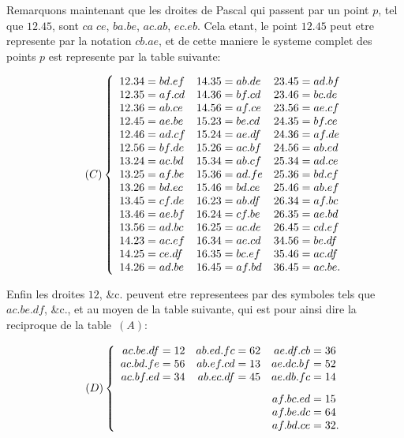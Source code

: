 \documentclass[12pt,a4paper]{article}
\begin{document}
\newpage
\setcounter{page}{552}

Remarquons maintenant que les droites de Pascal qui passent par un point $p$, tel que $12.45$, sont $ca\;ce$, $ba.be$, $ac.ab$, $ec.eb$. Cela etant, le point $12.45$ peut etre represente par la notation $cb.ae$, et de cette maniere le systeme complet des points $p$ est represente par la table suivante:

\begin{equation}
\tag{$C$}
\left\{
\begin{array}{r@{\;=\;}l r@{\;=\;}l r@{\;=\;}l}
12.34 & bd.ef & 14.35 & ab.de & 23.45 & ad.bf \\
12.35 & af.cd & 14.36 & bf.cd & 23.46 & bc.de \\
12.36 & ab.ce & 14.56 & af.ce & 23.56 & ae.cf \\
12.45 & ae.be & 15.23 & be.cd & 24.35 & bf.ce \\
12.46 & ad.cf & 15.24 & ae.df & 24.36 & af.de \\
12.56 & bf.de & 15.26 & ac.bf & 24.56 & ab.ed \\
13.24 & ac.bd & 15.34 & ab.cf & 25.34 & ad.ce \\
13.25 & af.be & 15.36 & ad.fe & 25.36 & bd.cf \\
13.26 & bd.ec & 15.46 & bd.ce & 25.46 & ab.ef \\
13.45 & cf.de & 16.23 & ab.df & 26.34 & af.bc \\
13.46 & ae.bf & 16.24 & cf.be & 26.35 & ae.bd \\
13.56 & ad.bc & 16.25 & ac.de & 26.45 & cd.ef \\
14.23 & ac.ef & 16.34 & ae.cd & 34.56 & be.df \\
14.25 & ce.df & 16.35 & bc.ef & 35.46 & ac.df \\
14.26 & ad.be & 16.45 & af.bd & 36.45 & ac.be.
\end{array}
\right.
\end{equation}

Enfin les droites $12$, \&c. peuvent etre representees par des symboles tels que $ac.be.df$, \&c., et au moyen de la table suivante, qui est pour ainsi dire la reciproque de la table~$(A)$:

\begin{equation}
\tag{$D$}
\left\{
\begin{array}{r@{\;=\;}l r@{\;=\;}l r@{\;=\;}l}
ac.be.df & 12 & ab.ed.fc & 62 & ae.df.cb & 36 \\
ac.bd.fe & 56 & ab.ef.cd & 13 & ae.dc.bf & 52 \\
ac.bf.ed & 34 & ab.ec.df & 45 & ae.db.fc & 14 \\[0.8em]
\multicolumn{2}{c}{} & \multicolumn{2}{c}{} & af.bc.ed & 15 \\
\multicolumn{2}{c}{} & \multicolumn{2}{c}{} & af.be.dc & 64 \\
\multicolumn{2}{c}{} & \multicolumn{2}{c}{} & af.bd.ce & 32.
\end{array}
\right.
\end{equation}
\end{document}

